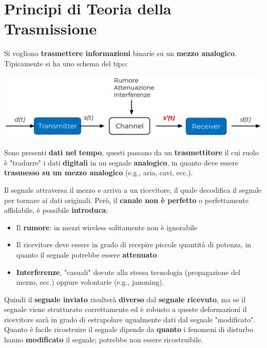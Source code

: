 \section{Principi di Teoria della Trasmissione}

Si vogliono \textbf{trasmettere informazioni} binarie su un \textbf{mezzo analogico}. Tipicamente si ha uno schema del tipo: 
\begin{center}
	\includegraphics[width=0.95\linewidth]{img/PTT/tr-scheme}
\end{center}

Sono presenti \textbf{dati nel tempo}, questi passano da un \textbf{trasmettitore} il cui ruolo è "tradurre" i dati \textbf{digitali} in un segnale \textbf{analogico}, in quanto deve essere \textbf{trasmesso su un mezzo analogico} (e.g., aria, cavi, ecc.). 

Il segnale attraversa il mezzo e arriva a un ricevitore, il quale decodifica il segnale per tornare ai dati originali. Però, il \textbf{canale non è perfetto} o perfettamente affidabile, è possibile \textbf{introduca}:
\begin{itemize}
	\item Il \textbf{rumore}: in mezzi wireless solitamente non è ignorabile
	
    \item Il ricevitore deve essere in grado di recepire piccole quantità di potenza, in quanto il segnale potrebbe essere \textbf{attenuato}
	
    \item \textbf{Interferenze}, "casuali" dovute alla stessa tecnologia (propagazione del mezzo, ecc.) oppure volontarie (e.g., jamming).
\end{itemize}

Quindi il \textbf{segnale inviato} risulterà \textbf{diverso} dal \textbf{segnale ricevuto}, ma se il segnale viene strutturato correttamente ed è robusto a queste deformazioni il ricevitore sarà in grado di estrapolare ugualmente dati dal segnale "modificato". Quanto è facile ricostruire il segnale dipende da \textbf{quanto} i fenomeni di disturbo hanno \textbf{modificato} il segnale; potrebbe non essere ricostruibile.

